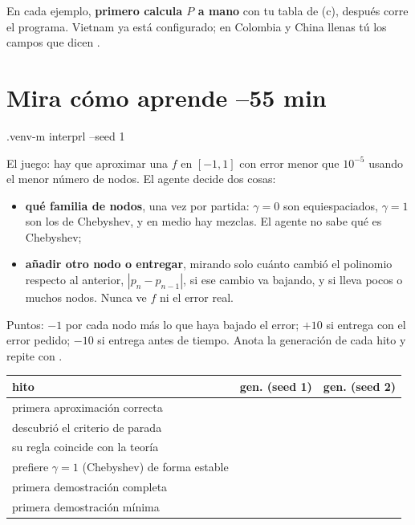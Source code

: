 En cada ejemplo, \textbf{primero calcula $P$ a mano} con tu tabla de (c), después corre el programa. Vietnam ya está configurado; en Colombia y China llenas tú los campos que dicen .
\begin{preguntas}
\end{preguntas}

\section{Mira cómo aprende \hfill\small{}–55 min}
\begin{orden}
.venv\Scripts\python -m interprl --seed 1
\end{orden}
El juego: hay que aproximar una $f$ en $[-1,1]$ con error menor que $10^{-5}$ usando el menor número de nodos. El agente decide dos cosas:
\begin{itemize}
\item \textbf{qué familia de nodos}, una vez por partida: $\gamma=0$ son equiespaciados, $\gamma=1$ son los de Chebyshev, y en medio hay mezclas. El agente no sabe qué es Chebyshev;
\item \textbf{añadir otro nodo o entregar}, mirando solo cuánto cambió el polinomio respecto al anterior, $|p_n-p_{n-1}|$, si ese cambio va bajando, y si lleva pocos o muchos nodos. Nunca ve $f$ ni el error real.
\end{itemize}
Puntos: $-1$ por cada nodo más lo que haya bajado el error; $+10$ si entrega con el error pedido; $-10$ si entrega antes de tiempo. Anota la generación de cada hito y repite con .

\renewcommand{\arraystretch}{2.0}
\begin{tabularx}{\linewidth}{|X|c|c|}
\hline
\textbf{hito} & \textbf{gen. (seed 1)} & \textbf{gen. (seed 2)} \\
\hline
primera aproximación correcta & \hspace{2.6cm} & \hspace{2.6cm} \\ \hline
descubrió el criterio de parada & & \\ \hline
su regla coincide con la teoría & & \\ \hline
prefiere $\gamma=1$ (Chebyshev) de forma estable & & \\ \hline
primera demostración completa & & \\ \hline
primera demostración mínima & & \\ \hline
\end{tabularx}
\renewcommand{\arraystretch}{1.25}

